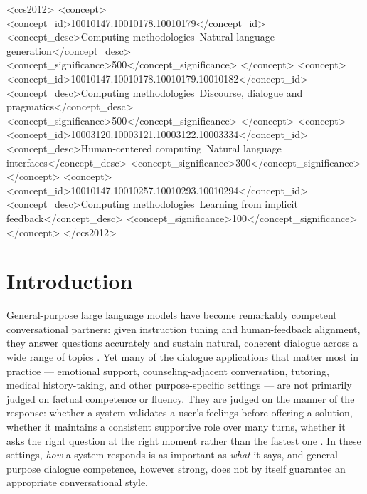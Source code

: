 \documentclass[manuscript,review,anonymous]{acmart}
\begin{document}
\begin{CCSXML}
<ccs2012>
 <concept>
  <concept_id>10010147.10010178.10010179</concept_id>
  <concept_desc>Computing methodologies~Natural language generation</concept_desc>
  <concept_significance>500</concept_significance>
 </concept>
 <concept>
  <concept_id>10010147.10010178.10010179.10010182</concept_id>
  <concept_desc>Computing methodologies~Discourse, dialogue and pragmatics</concept_desc>
  <concept_significance>500</concept_significance>
 </concept>
 <concept>
  <concept_id>10003120.10003121.10003122.10003334</concept_id>
  <concept_desc>Human-centered computing~Natural language interfaces</concept_desc>
  <concept_significance>300</concept_significance>
 </concept>
 <concept>
  <concept_id>10010147.10010257.10010293.10010294</concept_id>
  <concept_desc>Computing methodologies~Learning from implicit feedback</concept_desc>
  <concept_significance>100</concept_significance>
 </concept>
</ccs2012>
\end{CCSXML}



\maketitle

\section{Introduction}
\label{sec:intro}

General-purpose large language models have become remarkably competent conversational partners: given instruction tuning and human-feedback alignment, they answer questions accurately and sustain natural, coherent dialogue across a wide range of topics \cite{ouyang2022instructgpt}. Yet many of the dialogue applications that matter most in practice --- emotional support, counseling-adjacent conversation, tutoring, medical history-taking, and other purpose-specific settings --- are not primarily judged on factual competence or fluency. They are judged on the manner of the response: whether a system validates a user's feelings before offering a solution, whether it maintains a consistent supportive role over many turns, whether it asks the right question at the right moment rather than the fastest one \cite{rashkin2019empathetic,liu2021esconv}. In these settings, \emph{how} a system responds is as important as \emph{what} it says, and general-purpose dialogue competence, however strong, does not by itself guarantee an appropriate conversational style.
\end{document}
